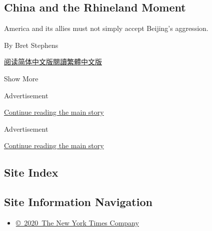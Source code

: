 \begin{enumerate}
  \hypertarget{china-and-the-rhineland-moment}{%
  \subsection{China and the Rhineland
  Moment}\label{china-and-the-rhineland-moment}}

  America and its allies must not simply accept Beijing's aggression.

  By Bret Stephens

  \href{https://cn.nytimes.com/opinion/20200604/china-hong-kong/}{阅读简体中文版}\href{https://cn.nytimes.com/opinion/20200604/china-hong-kong/zh-hant/}{閱讀繁體中文版}
\end{enumerate}

Show More

Advertisement

\protect\hyperlink{after-mid1}{Continue reading the main story}

Advertisement

\protect\hyperlink{after-mktg}{Continue reading the main story}

\hypertarget{site-index}{%
\subsection{Site Index}\label{site-index}}

\hypertarget{site-information-navigation}{%
\subsection{Site Information
Navigation}\label{site-information-navigation}}

\begin{itemize}
\tightlist
\item
  \href{https://help.nytimes.com/hc/en-us/articles/115014792127-Copyright-notice}{©~2020~The
  New York Times Company}
\end{itemize}

